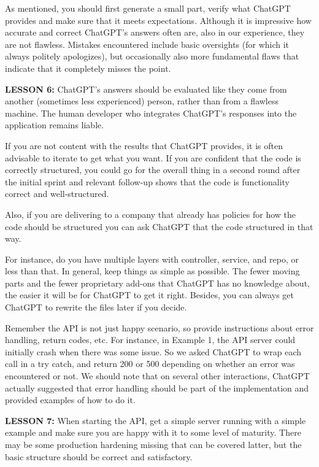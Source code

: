 \documentclass[runningheads]{llncs}
\begin{document}
As mentioned, you should first generate a small part, verify what ChatGPT provides and make sure that it meets expectations. Although it is impressive how accurate and
correct ChatGPT's answers often are, also in our experience, they are not flawless. Mistakes encountered include basic oversights (for which it always politely apologizes), but occasionally also more fundamental flaws that indicate that it completely misses the point.

\textbf{LESSON 6:} ChatGPT's answers should be evaluated like they come from another (sometimes less experienced) person, rather than from a flawless machine. The human developer who integrates ChatGPT's responses into the application remains liable.

If you are not content with the results that ChatGPT provides, it is often advisable to iterate to get what you want. If you are confident that the code is correctly structured, you could go for the overall thing in a second round after the initial sprint and relevant follow-up shows that the code is functionality correct and well-structured.

Also, if you are delivering to a company that already has policies for how the code should be structured you can ask ChatGPT that the code structured in that way.

For instance, do you have multiple layers with controller, service, and repo, or less than that. In general, keep things as simple as possible. The fewer moving parts and the fewer proprietary add-ons that ChatGPT has no knowledge about, the easier it will be for ChatGPT to get it right. Besides, you can always get ChatGPT to rewrite the 
files later if you decide.

Remember the API is not just happy scenario, so provide instructions about error handling, return codes, etc. For instance, in Example 1, the API server could initially crash when there was some issue. So we asked ChatGPT to wrap each call in a try catch, and return 200 or 500 depending on whether an error was encountered or not. We should note that on several other interactions, ChatGPT actually suggested that error handling should be part of the implementation and provided examples of how to do it.

\textbf{LESSON 7:} When starting the API, get a simple server running with a simple example and make sure you are happy with it to some level of maturity. There may be some production hardening missing that can be covered latter, but the basic structure should be correct and satisfactory.
\end{document}
